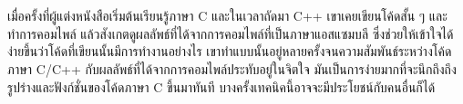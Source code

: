 \chapter{\THph{}}

เมื่อครั้งที่ผู้แต่งหนังสือเริ่มต้นเรียนรู้ภาษา C และในเวลาถัดมา C++ เขาเคยเขียนโค้ดสั้น ๆ และทำการคอมไพล์ แล้วสังเกตดูผลลัพธ์ที่ได้จากการคอมไพล์ที่เป็นภาษาแอสแซมบลี ซึ่งช่วยให้เข้าใจได้ง่ายขึ้นว่าโค้ดที่เขียนนั้นมีการทำงานอย่างไร เขาทำแบบนั้นอยู่หลายครั้งจนความสัมพันธ์ระหว่างโค้ดภาษา C/C++ กับผลลัพธ์ที่ได้จากการคอมไพล์ประทับอยู่ในจิตใจ มันเป็นการง่ายมากที่จะนึกถึงถึงรูปร่างและฟังก์ชั่นของโค้ดภาษา C ขึ้นมาทันที บางครั้งเทคนิคนี้อาจจะมีประโยชน์กับคนอื่นก็ได้	
\fi %

